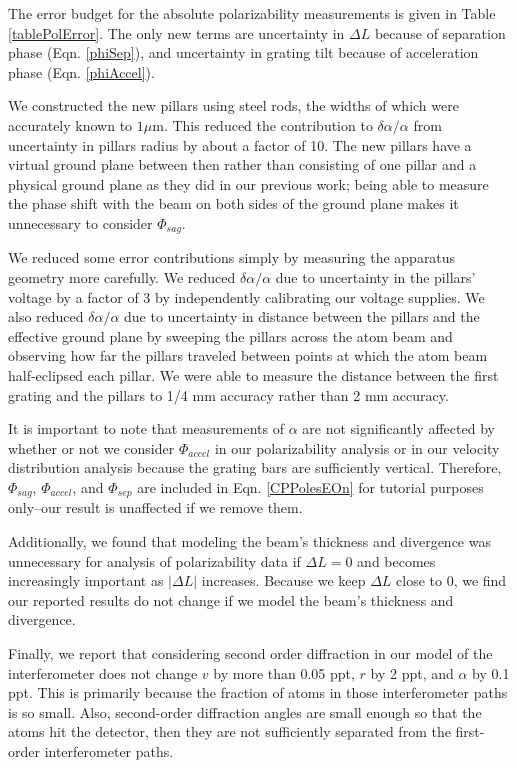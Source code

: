 \documentclass[twocolumn, prl,showpacs,superscriptaddress]{revtex4-1}   %
\newcommand{\eqnref}[1]{Eqn. \eqref{#1}}
\begin{document}
The error budget for the absolute polarizability measurements is given in Table \ref{tablePolError}. The only new terms are uncertainty in $\Delta L$ because of separation phase (\eqnref{phiSep}), and uncertainty in grating tilt because of acceleration phase (\eqnref{phiAccel}).

We constructed the new pillars using steel rods, the widths of which were accurately known to $1 \mu \text{m}$. This reduced the contribution to $\delta\alpha/\alpha$ from uncertainty in pillars radius by about a factor of 10. The new pillars have a virtual ground plane between then rather than consisting of one pillar and a physical ground plane as they did in our previous work; being able to measure the phase shift with the beam on both sides of the ground plane makes it unnecessary to consider $\Phi_{sag}$. 

We reduced some error contributions simply by measuring the apparatus geometry more carefully. We reduced $\delta\alpha/\alpha$ due to uncertainty in the pillars' voltage by a factor of 3 by independently calibrating our voltage supplies. We also reduced $\delta\alpha/\alpha$ due to uncertainty in distance between the pillars and the effective ground plane by sweeping the pillars across the atom beam and observing how far the pillars traveled between points at which the atom beam half-eclipsed each pillar. We were able to measure the distance between the first grating and the pillars to 1/4 mm accuracy rather than 2 mm accuracy. 

It is important to note that measurements of $\alpha$ are not significantly affected by whether or not we consider $\Phi_{accel}$ in our polarizability analysis or in our velocity distribution analysis because the grating bars are sufficiently vertical. Therefore, $\Phi_{sag}$, $\Phi_{accel}$, and $\Phi_{sep}$ are included in \eqnref{CPPolesEOn} for tutorial purposes only--our result is unaffected if we remove them.

Additionally, we found that modeling the beam's thickness and divergence was unnecessary for analysis of polarizability data if $\Delta L = 0$ and becomes increasingly important as $|\Delta L|$ increases. Because we keep $\Delta L$ close to 0, we find our reported results do not change if we model the beam's thickness and divergence.

Finally, we report that considering second order diffraction in our model of the interferometer does not change $v$ by more than 0.05 ppt, $r$ by 2 ppt, and $\alpha$ by 0.1 ppt. This is primarily because the fraction of atoms in those interferometer paths is so small. Also, second-order diffraction angles are small enough so that the atoms hit the detector, then they are not sufficiently separated from the first-order interferometer paths.
\end{document}
